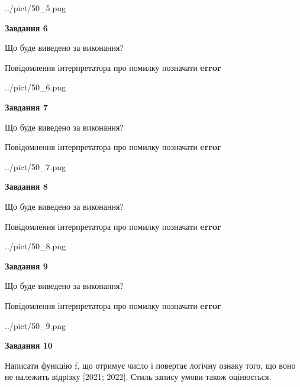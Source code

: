 \documentclass[12pt, ukrainian]{article}
\begin{document}
{\begin {large}
\begin{center}
	{../pict/50_5.png}
\end{center}
\newpage

{\begin {center}\textbf{Завдання 6}\end {center}}\par
Що буде виведено за виконання? \par
Повідомлення інтерпретатора про помилку позначати \textbf{error}

\begin{center}
	{../pict/50_6.png}
\end{center}
\newpage

{\begin {center}\textbf{Завдання 7}\end {center}}\par
Що буде виведено за виконання? \par
Повідомлення інтерпретатора про помилку позначати \textbf{error}

\begin{center}
	{../pict/50_7.png}
\end{center}
\newpage

{\begin {center}\textbf{Завдання 8}\end {center}}\par
Що буде виведено за виконання? \par
Повідомлення інтерпретатора про помилку позначати \textbf{error}

\begin{center}
	{../pict/50_8.png}
\end{center}
\newpage

{\begin {center}\textbf{Завдання 9}\end {center}}\par
Що буде виведено за виконання? \par
Повідомлення інтерпретатора про помилку позначати \textbf{error}

\begin{center}
	{../pict/50_9.png}
\end{center}
\newpage

{\begin {center}\textbf{Завдання 10}\end {center}}\par

Написати функцiю f, що отримує число і повертає логічну ознаку того, що воно не належить вiдрiзку [2021; 2022]. Стиль запису умови також оцінюється.\par
\newpage

\end {large}}
\end{document}
